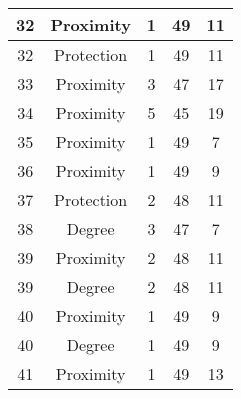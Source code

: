 \documentclass[results.tex]{subfiles}
\begin{document}
\begin{center}
\begin{tabular}{| c || c | c | c | c |}
            \hline
            32                      & Proximity                    & 1                      & 49                      & 11                   \\
            \hline
            32                      & Protection                   & 1                      & 49                      & 11                   \\
            \hline
            33                      & Proximity                    & 3                      & 47                      & 17                   \\
            \hline
            34                      & Proximity                    & 5                      & 45                      & 19                   \\
            \hline
            35                      & Proximity                    & 1                      & 49                      & 7                    \\
            \hline
            36                      & Proximity                    & 1                      & 49                      & 9                    \\
            \hline
            37                      & Protection                   & 2                      & 48                      & 11                   \\
            \hline
            38                      & Degree                       & 3                      & 47                      & 7                    \\
            \hline
            39                      & Proximity                    & 2                      & 48                      & 11                   \\
            \hline
            39                      & Degree                       & 2                      & 48                      & 11                   \\
            \hline
            40                      & Proximity                    & 1                      & 49                      & 9                    \\
            \hline
            40                      & Degree                       & 1                      & 49                      & 9                    \\
            \hline
            41                      & Proximity                    & 1                      & 49                      & 13                   \\

\end{tabular}
\end{center}
\end{document}
